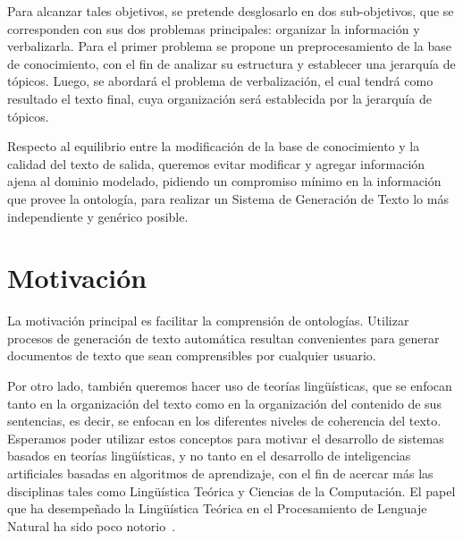 \documentclass[11pt,a4paper,spanish]{book}
\begin{document}
Para alcanzar tales objetivos, se pretende desglosarlo en dos sub-objetivos, que se corresponden con sus dos problemas principales: organizar la información y verbalizarla. Para el primer problema se propone un preprocesamiento de la base de conocimiento, con el fin de analizar su estructura y establecer una jerarquía de tópicos. Luego, se abordará el problema de verbalización, el cual tendrá como resultado el texto final, cuya organización será establecida por la jerarquía de tópicos.

Respecto al equilibrio entre la modificación de la base de conocimiento y la calidad del texto de salida, queremos evitar modificar y agregar información ajena al dominio modelado, pidiendo un compromiso mínimo en la información que provee la ontología, para realizar un Sistema de Generación de Texto lo más independiente y genérico posible.

\section{Motivación}
La motivación principal es facilitar la comprensión de ontologías. Utilizar procesos de generación de texto automática resultan convenientes para generar documentos de texto que sean comprensibles por cualquier usuario.

Por otro lado, también queremos hacer uso de teorías lingüísticas, que se enfocan tanto en la organización del texto como en la organización del contenido de sus sentencias, es decir, se enfocan en los diferentes niveles de coherencia del texto. Esperamos poder utilizar estos conceptos para motivar el desarrollo de sistemas basados en teorías lingüísticas, y no tanto en el desarrollo de inteligencias artificiales basadas en algoritmos de aprendizaje, con el fin de acercar más las disciplinas tales como Lingüística Teórica y Ciencias de la Computación. El papel que ha desempeñado la Lingüística Teórica en el Procesamiento de Lenguaje Natural ha sido poco notorio~\cite{perinan2012defensa}.




%











\end{document}

